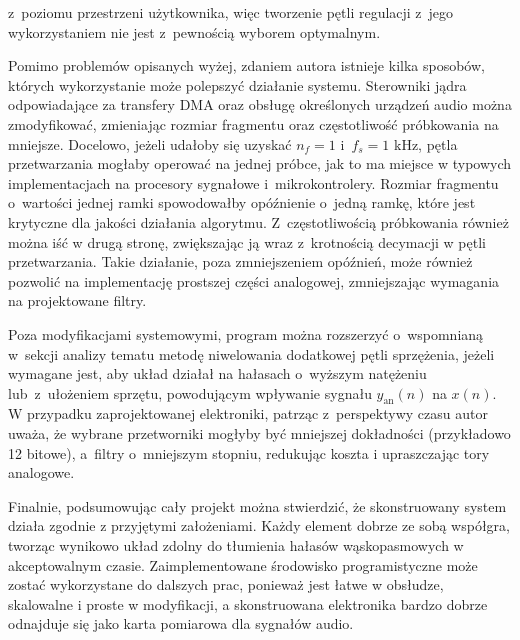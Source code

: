 z~poziomu przestrzeni użytkownika, więc tworzenie pętli regulacji z~jego
wykorzystaniem nie jest z~pewnością wyborem optymalnym. \par Pomimo problemów
opisanych wyżej, zdaniem autora istnieje kilka sposobów, których wykorzystanie
może polepszyć działanie systemu. Sterowniki jądra odpowiadające za transfery
DMA oraz obsługę określonych urządzeń audio można zmodyfikować, zmieniając
rozmiar fragmentu oraz częstotliwość próbkowania na mniejsze. Docelowo, jeżeli
udałoby się uzyskać $n_f = 1$ i~$f_s = 1$ kHz, pętla przetwarzania mogłaby
operować na jednej próbce, jak to ma miejsce w typowych implementacjach na
procesory sygnałowe i~mikrokontrolery. Rozmiar fragmentu o~wartości jednej ramki
spowodowałby opóźnienie o~jedną ramkę, które jest krytyczne dla jakości
działania algorytmu. Z~częstotliwością próbkowania również można iść w drugą
stronę, zwiększając ją wraz z~krotnością decymacji w pętli przetwarzania. Takie
działanie, poza zmniejszeniem opóźnień, może również pozwolić na implementację
prostszej części analogowej, zmniejszając wymagania na projektowane filtry. \par
Poza modyfikacjami systemowymi, program można rozszerzyć o~wspomnianą w~sekcji
analizy tematu metodę niwelowania dodatkowej pętli sprzężenia, jeżeli wymagane
jest, aby układ działał na hałasach o~wyższym natężeniu lub~z~ułożeniem sprzętu,
powodującym wpływanie sygnału $y_{\text{an}}(n)$ na $x(n)$. W przypadku
zaprojektowanej elektroniki, patrząc z~perspektywy czasu autor uważa, że wybrane
przetworniki mogłyby być mniejszej dokładności (przykładowo 12 bitowe), a~filtry
o~mniejszym stopniu, redukując koszta i upraszczając tory analogowe. \par
Finalnie, podsumowując cały projekt można stwierdzić, że skonstruowany system
działa zgodnie z przyjętymi założeniami. Każdy element dobrze ze sobą współgra,
tworząc wynikowo układ zdolny do tłumienia hałasów wąskopasmowych w
akceptowalnym czasie. Zaimplementowane środowisko programistyczne może zostać
wykorzystane do dalszych prac, ponieważ jest łatwe w obsłudze, skalowalne i
proste w modyfikacji, a skonstruowana elektronika bardzo dobrze odnajduje się
jako karta pomiarowa dla sygnałów audio.

